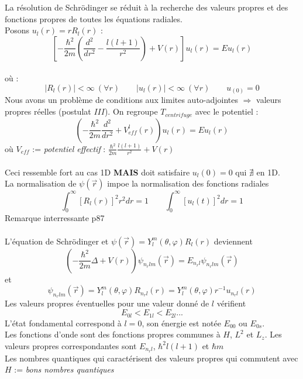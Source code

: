 \documentclass	[11pt, a4paper, openany]{book}
\begin{document}
La résolution de Schrödinger se réduit à la recherche des valeurs propres et des fonctions propres de toutes les équations radiales.\\
Posons $u_l(r)=rR_l(r)$ : \begin{equation}
\left[-\frac{\hbar^2}{2m}\left(\frac{d^2}{dr^2}-\frac{l(l+1)}{r^2}\right)+V(r)\right]u_l(r)=Eu_l(r)
\end{equation}
\ \\
où : 
\begin{equation}
|R_l(r)|<\infty\ (\forall r)\qquad
|u_l(r)|<\infty\ (\forall r)\qquad
u_(0)=0
\end{equation}
Nous avons un problème de conditions aux limites auto-adjointes $\Rightarrow$ valeurs propres réelles (postulat $III$). On regroupe $T_{centrifuge}$ avec le potentiel : \begin{equation}\label{eq:6.14}
\left(-\frac{\hbar^2}{2m}\frac{d^2}{dr^2}+V^l_{eff}(r)\right)u_l(r)=Eu_l(r)
\end{equation}
où $V_{eff}$ := \textit{potentiel effectif} : $\frac{\hbar^2}{2m}\frac{l(l+1)}{r^2}+V(r)$\\\\
Ceci ressemble fort au cas 1D \textbf{MAIS} doit satisfaire $u_l(0)=0$ qui $\nexists$ en 1D.\\
La normalisation de $\psi(\vec r)$ impoe la normalisation des fonctions radiales $$\int_0^{\infty}[R_l(r)]^2r^2dr=1\qquad\int_0^{\infty}[u_l(t)]^2dr=1$$Remarque interressante p87\\\\
L'équation de Schrödinger et $\psi(\vec r)=Y^m_l(\theta,\varphi)R_l(r)$ deviennent \begin{equation}
\left(-\frac{\hbar^2}{2m}\Delta+V(r)\right)\psi_{n_rlm}(\vec r)=E_{n_rl}\psi_{n_rlm}(\vec r)
\end{equation}
et
\begin{equation}
\psi_{n_rlm}(\vec r)=Y^m_l(\theta,\varphi)R_{n_rl}(r)=Y_l^m(\theta,\varphi)r^{-1}u_{n_rl}(r)
\end{equation}
Les valeurs propres éventuelles pour une valeur donné de $l$ vérifient \begin{equation}
E_{0l}<E_{1l}<E_{2l}...
\end{equation}
L'état fondamental correspond à $l=0$, son énergie est notée $E_{00}$ ou $E_{0s}$.\\

Les fonctions d'onde sont des fonctions propres communes à $H$, $L^2$ et $L_z$. Les valeurs propres correspondantes sont $E_{n_rl}$, $\hbar^2l(l+1)$ et $\hbar m$\\
Les nombres quantiques qui caractérisent des valeurs propres qui commutent avec $H$ := \textit{bons nombres quantiques}
\end{document}
